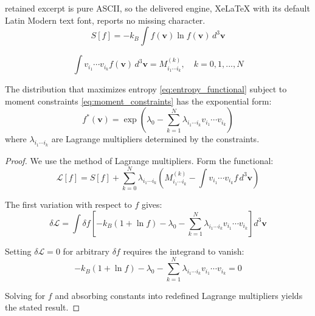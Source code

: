 \documentclass[10pt,a4paper]{amsart}
\newcommand{\vect}[1]{\mathbf{#1}}
\begin{document}
retained excerpt is pure ASCII, so the delivered engine, XeLaTeX with its default Latin Modern text font, reports no missing character.
\begin{equation}
S[f] = -k_B \int f(\vect{v}) \ln f(\vect{v}) \, d^3\vect{v}
\label{eq:entropy_functional}
\end{equation}

\begin{equation}
\int v_{i_1} \cdots v_{i_k} f(\vect{v}) \, d^3\vect{v} = M_{i_1 \cdots i_k}^{(k)}, \quad k = 0,1,...,N
\label{eq:moment_constraints}
\end{equation}

\begin{theorem}
\label{thm:maxent}
The distribution that maximizes entropy \eqref{eq:entropy_functional} subject to moment constraints \eqref{eq:moment_constraints} has the exponential form:
\begin{equation}
f^*(\vect{v}) = \exp\left(\lambda_0 - \sum_{k=1}^N \lambda_{i_1 \cdots i_k} v_{i_1} \cdots v_{i_k}\right)
\label{eq:maxent_distribution}
\end{equation}
where $\lambda_{i_1 \cdots i_k}$ are Lagrange multipliers determined by the constraints.
\end{theorem}

\begin{proof}
We use the method of Lagrange multipliers. Form the functional:
\begin{equation}
\mathcal{L}[f] = S[f] + \sum_{k=0}^N \lambda_{i_1 \cdots i_k} \left(M_{i_1 \cdots i_k}^{(k)} - \int v_{i_1} \cdots v_{i_k} f \, d^3\vect{v}\right)
\label{eq:lagrangian_functional}
\end{equation}

The first variation with respect to $f$ gives:
\begin{equation}
\delta \mathcal{L} = \int \delta f \left[-k_B(1 + \ln f) - \lambda_0 - \sum_{k=1}^N \lambda_{i_1 \cdots i_k} v_{i_1} \cdots v_{i_k}\right] d^3\vect{v}
\label{eq:variation}
\end{equation}

Setting $\delta \mathcal{L} = 0$ for arbitrary $\delta f$ requires the integrand to vanish:
\begin{equation}
-k_B(1 + \ln f) - \lambda_0 - \sum_{k=1}^N \lambda_{i_1 \cdots i_k} v_{i_1} \cdots v_{i_k} = 0
\label{eq:euler_lagrange}
\end{equation}

Solving for $f$ and absorbing constants into redefined Lagrange multipliers yields the stated result.
\end{proof}
\end{document}
